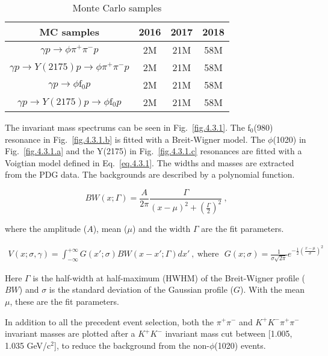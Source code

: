 \begin{table}[H]
    \centering
    \caption{Monte Carlo samples}
    \label{tab.4.3}
    \begin{tabular}{|c|c|c|c|}
        \hline
        MC samples & 2016 & 2017 & 2018 \\
        \hline
        $\gamma p \rightarrow \phi \pi^+ \pi^- p$ & 2M & 21M & 58M \\
        \hline
        $\gamma p \rightarrow Y(2175) p \rightarrow \phi \pi^+ \pi^- p$ & 2M & 21M & 58M \\
        \hline
        $\gamma p \rightarrow \phi \mathrm{f}_0 p$ & 2M & 21M & 58M \\
        \hline
        $\gamma p \rightarrow Y(2175) p \rightarrow \phi \mathrm{f}_0 p$ & 2M & 21M & 58M \\
        \hline
    \end{tabular}
\end{table}

The invariant mass spectrums can be seen in Fig.~\ref{fig.4.3.1}. The f$_0$(980) resonance in Fig.~\ref{fig.4.3.1.b} is fitted with a Breit-Wigner model. The $\phi$(1020) in Fig.~\ref{fig.4.3.1.a} and the Y(2175) in Fig.~\ref{fig.4.3.1.c} resonances are fitted with a Voigtian model defined in Eq.~\ref{eq.4.3.1}. The widths and masses are extracted from the PDG data. The backgrounds are described by a polynomial function.

\begin{equation}
    \label{eq.4.3.2}
    BW(x;\Gamma) =  \frac{A}{2\pi}\frac{\Gamma}{(x-\mu)^2+(\frac{\Gamma}{2})^2}~,
\end{equation}

where the amplitude ($A$), mean ($\mu$) and the width $\Gamma$ are the fit parameters.

\begin{equation}
\label{eq.4.3.1}
    \begin{aligned}
        V(x;\sigma,\gamma) = \int_{-\infty}^{+\infty} G(x';\sigma) BW(x-x';\Gamma)dx'~,~\mathrm{where}~~~G(x;\sigma) = \frac{1}{\sigma \sqrt{2\pi}}e^{-\frac{1}{2}(\frac{x-\mu}{\sigma})^2}
    \end{aligned}
\end{equation}

Here $\Gamma$ is the half-width at half-maximum (HWHM) of the Breit-Wigner profile ($BW$) and $\sigma$ is the standard deviation of the Gaussian profile ($G$). With the mean $\mu$, these are the fit parameters.
\par In addition to all the precedent event selection, both the $\pi^+ \pi^-$ and $K^+ K^- \pi^+ \pi^-$ invariant masses are plotted after a $K^+ K^-$ invariant mass cut between [1.005, 1.035 GeV/c$^2$], to reduce the background from the non-$\phi$(1020) events.

